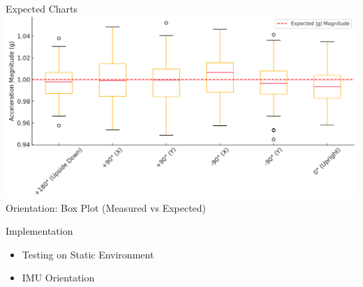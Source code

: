 \documentclass{beamer}
\begin{document}
\begin{frame}{Expected Charts}
     \centering 
    \includegraphics[width=1.0\textwidth, height=0.8\textheight, keepaspectratio]{images/orientation-boxplot.png}
    \vspace{0.5em} 
 Orientation: Box Plot (Measured vs Expected)
\end{frame}

\begin{frame}{Implementation}
    \begin{itemize}
        \item Testing on Static Environment
        \item IMU Orientation 
    \end{itemize}
\end{frame}
\end{document}
